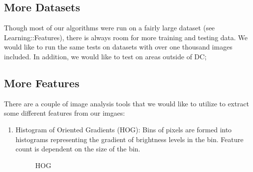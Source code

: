 \documentclass{article}
\begin{document}
\subsection{More Datasets}
Though most of our algorithms were run on a fairly large dataset (see Learning::Features), there is always room for more training and testing data. We would like to run the same tests on datasets with over one thousand images included. In addition, we would like to test on areas outside of DC;


\subsection{More Features}
There are a couple of image analysis tools that we would like to utilize to extract some different features from our imgaes: 
\begin{enumerate}[1.]
\item Histogram of Oriented Gradients (HOG): Bins of pixels are formed into histograms representing the gradient of brightness levels in the bin. Feature count is dependent on the size of the bin. 
\begin{figure}[H]
\centering
\setlength\fboxsep{2pt}
\setlength\fboxrule{0pt}
\caption{
HOG
}
\end{figure}


\end{enumerate}
\end{document}
